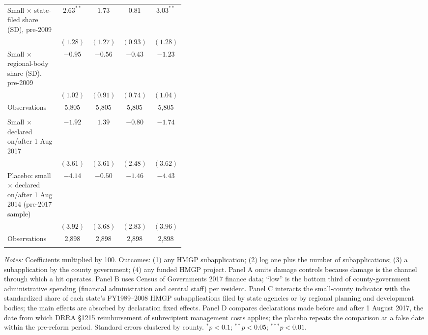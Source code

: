 \begin{table}[!htbp]
\begin{threeparttable}
\begin{tabular}{@{}>{\raggedright\arraybackslash}p{0.42\linewidth}cccc@{}}
Small $\times$ state-filed share (SD), pre-2009 & $2.63^{**}$ & $1.73$ & $0.81$ & $3.03^{**}$ \\
 & $(1.28)$ & $(1.27)$ & $(0.93)$ & $(1.28)$ \\
Small $\times$ regional-body share (SD), pre-2009 & $-0.95$ & $-0.56$ & $-0.43$ & $-1.23$ \\
 & $(1.02)$ & $(0.91)$ & $(0.74)$ & $(1.04)$ \\
\quad Observations & 5,805 & 5,805 & 5,805 & 5,805 \\
\addlinespace
\multicolumn{5}{l}{\textit{Panel D. Management-cost reimbursement, DRRA \S1215 (county and declaration fixed effects)}} \\
Small $\times$ declared on/after 1 Aug 2017 & $-1.92$ & $1.39$ & $-0.80$ & $-1.74$ \\
 & $(3.61)$ & $(3.61)$ & $(2.48)$ & $(3.62)$ \\
Placebo: small $\times$ declared on/after 1 Aug 2014 (pre-2017 sample) & $-4.14$ & $-0.50$ & $-1.46$ & $-4.43$ \\
 & $(3.92)$ & $(3.68)$ & $(2.83)$ & $(3.96)$ \\
\quad Observations & 2,898 & 2,898 & 2,898 & 2,898 \\
\addlinespace
\bottomrule
\end{tabular}
\begin{tablenotes}[flushleft]
\footnotesize
\item \textit{Notes:} Coefficients multiplied by 100. Outcomes: (1) any HMGP subapplication; (2) log one plus the number of subapplications; (3) a subapplication by the county government; (4) any funded HMGP project. Panel A omits damage controls because damage is the channel through which a hit operates. Panel B uses Census of Governments 2017 finance data; ``low'' is the bottom third of county-government administrative spending (financial administration and central staff) per resident. Panel C interacts the small-county indicator with the standardized share of each state's FY1989--2008 HMGP subapplications filed by state agencies or by regional planning and development bodies; the main effects are absorbed by declaration fixed effects. Panel D compares declarations made before and after 1 August 2017, the date from which DRRA \S1215 reimbursement of subrecipient management costs applies; the placebo repeats the comparison at a false date within the pre-reform period. Standard errors clustered by county. $^{*}p<0.1$; $^{**}p<0.05$; $^{***}p<0.01$.
\end{tablenotes}
\end{threeparttable}
\end{table}
